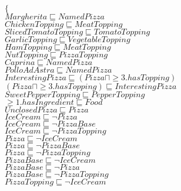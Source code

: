 \documentclass[a4paper,10pt]{article}
\begin{document}
 \newcommand{\nxt}{{\ensuremath\raisebox{0.25ex}{\text{\scriptsize$\bigcirc$}}}}
\newcommand{\Rdiamond}{\Diamond_{\!F}}
\newcommand{\Rbox}{\Box_{\!F}}
\newcommand{\Rnext}{\nxt_{\!F}}
\newcommand{\Ldiamond}{\Diamond_{\!P}}
\newcommand{\Lbox}{\Box_{\!P}}
\newcommand{\Lnext}{\nxt_{\!P}}
\newcommand{\SVdiamond}{\mathop{\ooalign{$\Diamond$ \cr \kern0.5ex
    \raisebox{0.35ex}{\scalebox{0.7}{$*$}}} \kern-0.9ex}}
\newcommand{\SVbox}{\mathop{\ooalign{$\Box$ \cr \kern0.42ex
    \raisebox{0.3ex}{\scalebox{0.7}{$*$}}} \kern-0.9ex}}


 $\{$\\ 
$Margherita \sqsubseteq NamedPizza$\\ 
 $ChickenTopping \sqsubseteq MeatTopping$\\ 
 $SlicedTomatoTopping \sqsubseteq TomatoTopping$\\ 
 $GarlicTopping \sqsubseteq VegetableTopping$\\ 
 $HamTopping \sqsubseteq MeatTopping$\\ 
 $NutTopping \sqsubseteq PizzaTopping$\\ 
 $Caprina \sqsubseteq NamedPizza$\\ 
 $PolloAdAstra \sqsubseteq NamedPizza$\\ 
 $InterestingPizza \sqsubseteq  ( Pizza   \sqcap    \ge 3.hasTopping ) $\\ 
 $ ( Pizza   \sqcap    \ge 3.hasTopping )  \sqsubseteq InterestingPizza$\\ 
 $SweetPepperTopping \sqsubseteq PepperTopping$\\ 
 $ \ge 1.hasIngredient \sqsubseteq Food$\\ 
 $UnclosedPizza \sqsubseteq Pizza$\\ 
 $IceCream \sqsubseteq  \lnot Pizza$\\ 
 $IceCream \sqsubseteq  \lnot PizzaBase$\\ 
 $IceCream \sqsubseteq  \lnot PizzaTopping$\\ 
 $Pizza \sqsubseteq  \lnot IceCream$\\ 
 $Pizza \sqsubseteq  \lnot PizzaBase$\\ 
 $Pizza \sqsubseteq  \lnot PizzaTopping$\\ 
 $PizzaBase \sqsubseteq  \lnot IceCream$\\ 
 $PizzaBase \sqsubseteq  \lnot Pizza$\\ 
 $PizzaBase \sqsubseteq  \lnot PizzaTopping$\\ 
 $PizzaTopping \sqsubseteq  \lnot IceCream$\\ 
\end{document}
